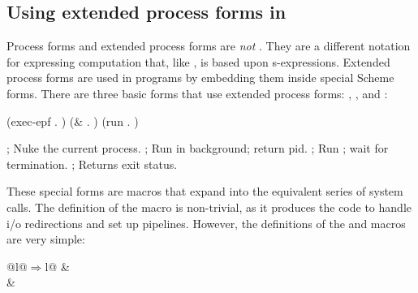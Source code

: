 
\subsection{Using extended process forms in \Scheme}
Process forms and extended process forms are {\em not\/} {\Scheme}.
They are a different notation for expressing computation that, like {\Scheme},
is based upon s-expressions.
Extended process forms are used in {\Scheme} programs by embedding them inside
special Scheme forms.
\pagebreak
There are three basic {\Scheme} forms that use extended process forms: 
, \cd{&}, and :
\begin{inset}
\begin{codebox}[t]
(exec-epf . )
(& . )         
(run . )
\end{codebox}
\quad
\begin{codebox}[t]
; Nuke the current process.
; Run  in background; return pid.
; Run ; wait for termination.
;    Returns exit status.\end{codebox}
\end{inset}
These special forms are macros that expand into the equivalent
series of system calls.
The definition of the  macro is non-trivial, 
as it produces the code to handle i/o redirections and set up pipelines.
However, the definitions of the \cd{&} and  macros are very simple:
\begin{leftinset}
\begin{tabular}{@{}l@{\quad$\Rightarrow$\quad}l@{}}
 &  \\
 & 
\end{tabular}
\end{leftinset}

